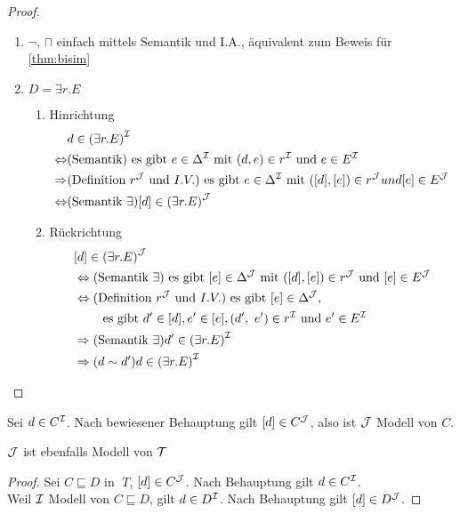 \begin{tafel}
\begin{proof}
\begin{enumerate}
    \item $\neg$, $\sqcap$ einfach mittels Semantik und I.A., äquivalent zum Beweis für \autoref{thm:bisim}
\item $D = \exists r.E$
  \begin{enumerate}
  \def\labelenumi{\alph{enumi}.}
  \def\labelenumii{\alph{enumii}.}
  \item Hinrichtung
      \begin{align*}
          &d \in \left( \exists r.E \right)^\MI\\
          \Leftrightarrow &(\text{Semantik})\text{ es gibt }e \in \Delta^\MI \text{ mit } \left( d,e \right) \in r^\MI \text{ und } e \in E^\MI \\
          \Rightarrow &(\text{Definition }r^{\MJ} \text{ und } I.V.) \text{ es gibt }e \in \Delta^\MI \text{ mit }\left( \left\lbrack d \right\rbrack,\left\lbrack e \right\rbrack \right) \in r^{\MJ} und \left\lbrack e \right\rbrack \in E^{\MJ} \\
          \Leftrightarrow &(\text{Semantik } \exists) \left\lbrack d \right\rbrack \in \left( \exists r.E \right)^{\MJ}
      \end{align*}
    \item Rückrichtung
        \begin{align*}
            &\left\lbrack d \right\rbrack \in \left( \exists r.E \right)^{\MJ} \\
            &\Leftrightarrow (\text{Semantik }\exists) \text{ es gibt }[e] \in \Delta^{\MJ} \text{ mit } \left( \left\lbrack d \right\rbrack,\left\lbrack e \right\rbrack \right) \in r^{\MJ}\text{ und }\left\lbrack e \right\rbrack \in E^{\MJ} \\
            &\Leftrightarrow (\text{Definition }r^{\MJ} \text{ und }I.V.) \text{ es gibt }[e] \in \Delta^{\MJ},\\
            &\quad\quad\text{ es gibt }d' \in \left\lbrack d \right\rbrack, e' \in \left\lbrack e \right\rbrack, \left( d',\ e' \right) \in r^\MI \text{ und }e' \in E^\MI \\
            &\Rightarrow (\text{Semantik }\exists) d' \in \left( \exists r.E \right)^\MI \\
            &\Rightarrow (d \sim d') d \in \left( \exists r.E \right)^\MI
        \end{align*}
\end{enumerate}
\end{enumerate}
\end{proof}
Sei $d \in C^{\mathcal{I}}$. Nach bewiesener Behauptung gilt $[d] \in C^{\mathcal{J}}$, also ist $\mathcal{J}$ Modell von $C$.

$\mathcal{J}$ ist ebenfalls Modell von $\mathcal{T}$
\begin{proof}
Sei $C \sqsubseteq D$ in $\;T$, $[d] \in C^{\mathcal{J}}$.
Nach Behauptung gilt $d \in C^{\mathcal{I}}$. \\
Weil $\mathcal{I}$ Modell von $C \sqsubseteq D$, gilt $d \in D^{\mathcal{I}}$.
Nach Behauptung gilt $[d] \in D^{\mathcal{J}}$.
\end{proof}
\end{tafel}


